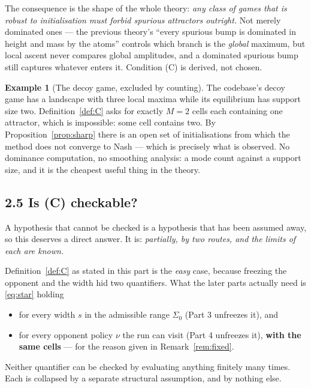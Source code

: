 \documentclass[11pt]{article}
\theoremstyle{definition}
\newtheorem{example}[theorem]{Example}
\begin{document}
The consequence is the shape of the whole theory: \emph{any class of games that
is robust to initialisation must forbid spurious attractors outright.} Not merely
dominated ones --- the previous theory's ``every spurious bump is dominated in
height and mass by the atoms'' controls which branch is the \emph{global} maximum,
but local ascent never compares global amplitudes, and a dominated spurious bump
still captures whatever enters it. Condition (C) is derived, not chosen.

\begin{example}[The decoy game, excluded by counting]\label{ex:decoy}
The codebase's decoy game has a landscape with three local maxima while its
equilibrium has support size two. Definition~\ref{def:C} asks for exactly $M = 2$
cells each containing one attractor, which is impossible: some cell contains two.
By Proposition~\ref{prop:sharp} there is an open set of initialisations from which
the method does not converge to Nash --- which is precisely what is observed. No
dominance computation, no smoothing analysis: a mode count against a support size,
and it is the cheapest useful thing in the theory.
\end{example}

\subsection*{2.5 Is (C) checkable?}

A hypothesis that cannot be checked is a hypothesis that has been assumed away, so
this deserves a direct answer. It is: \emph{partially, by two routes, and the
limits of each are known.}

Definition~\ref{def:C} as stated in this part is the \emph{easy} case, because
freezing the opponent and the width hid two quantifiers. What the later parts
actually need is \eqref{eq:star} holding
\begin{itemize}[leftmargin=1.4em, itemsep=1pt]
\item for every width $s$ in the admissible range $\Sigma_0$ (Part 3 unfreezes
  it), and
\item for every opponent policy $\nu$ the run can visit (Part 4 unfreezes it),
  \textbf{with the same cells} --- for the reason given in
  Remark~\ref{rem:fixed}.
\end{itemize}
Neither quantifier can be checked by evaluating anything finitely many times. Each
is collapsed by a separate structural assumption, and by nothing else.
\end{document}
